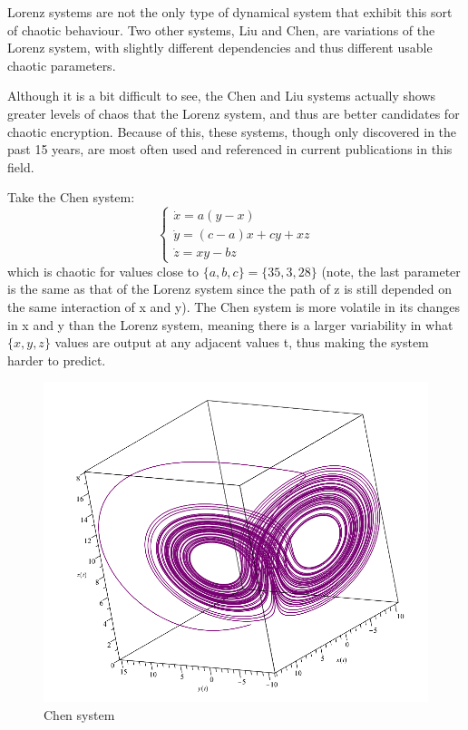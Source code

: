\par Lorenz systems are not the only type of dynamical system that exhibit this sort of chaotic behaviour.  Two other systems, Liu and Chen, are variations of the Lorenz system, with slightly different dependencies and thus different usable chaotic parameters.

\par Although it is a bit difficult to see, the Chen and Liu systems actually shows greater levels of chaos that the Lorenz system, and thus are better candidates for chaotic encryption.  Because of this, these systems, though only discovered in the past 15 years,  are most often used and referenced in current publications in this field.

\par Take the Chen system:
%
\begin{equation}
\begin{cases} 
\dot{x} = a(y - x) \\ 
\dot{y} = (c - a)x + cy + xz \\
\dot{z} = xy - bz
\end{cases}
\end{equation}
%
which is chaotic for values close to $\{a,b,c\} = \{35,3,28\}$ (note, the last parameter is the same as that of the Lorenz system since the path of z is still depended on the same interaction of x and y).  The Chen system is more volatile in its changes in x and y than the Lorenz system, meaning there is a larger variability in what $\{x,y,z\}$ values are output at any adjacent values t, thus making the system harder to predict.

\begin{figure}[H]
    \centering
	\includegraphics[width=\linewidth]{chen2.PNG}
	\caption{Chen system}
	\label{fig:chen}
\end{figure}

